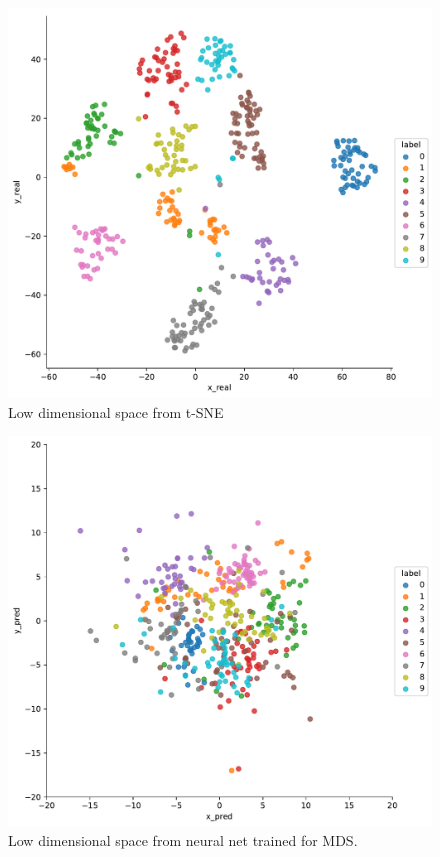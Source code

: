 \documentclass[a4paper,11pt,spanish]{report}
\begin{document}
\begin{figure}[p]
\centering
\includegraphics[width=12cm]{figures/app1plotreal.pdf}
\caption{\label{figureTSNE}Low dimensional space from t-SNE}
\end{figure}

\begin{figure}[p]
\centering
\includegraphics[width=12cm]{figures/app1plotpredictionsmds.pdf}
\caption{\label{figureNN2}Low dimensional space from neural net trained for MDS.}
\end{figure}
\end{document}

